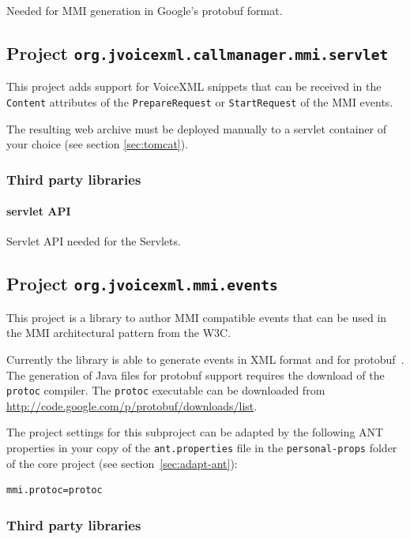 \documentclass[11pt,a4paper]{article}
\begin{document}
Needed for MMI generation in Google's protobuf format.

\subsection{Project \texttt{org.jvoicexml.callmanager.mmi.servlet}}
\label{sec:mmi-servlet}

This project adds support for VoiceXML snippets that can be received
in the \lstinline{Content} attributes of the \lstinline{PrepareRequest}
or \lstinline{StartRequest} of the MMI events.

The resulting web archive must be deployed manually to a servlet container
of your choice (see section \ref{sec:tomcat}).

\subsubsection{Third party libraries}

\paragraph{servlet API}

Servlet API needed for the Servlets.

\subsection{Project \texttt{org.jvoicexml.mmi.events}}
\label{sec:mmi-events}

This project is a library to author MMI compatible events that can be used in
the MMI architectural pattern from the W3C.

Currently the library is able to generate events in XML format and for
protobuf~\cite{google:protobuf}. The generation of Java files for protobuf
support requires the download of the \texttt{protoc} compiler. The \texttt{protoc}
executable can be downloaded from \url{http://code.google.com/p/protobuf/downloads/list}.

The project settings for this subproject can be adapted by the following ANT
properties in your copy of the \texttt{ant.properties} file in the
\texttt{personal-props} folder of the core project (see 
section~\ref{sec:adapt-ant}):
\begin{lstlisting}
mmi.protoc=protoc
\end{lstlisting}

\subsubsection{Third party libraries}
\end{document}
